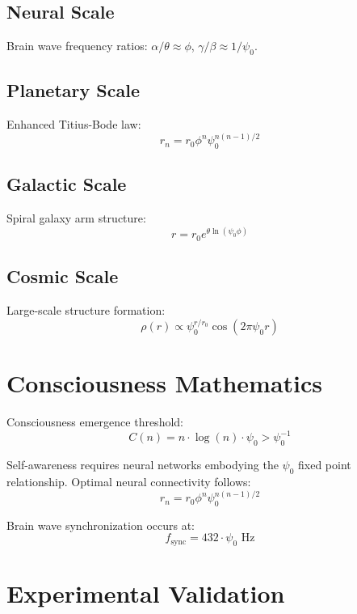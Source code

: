 \documentclass[12pt]{article}
\begin{document}
\subsection{Neural Scale}
Brain wave frequency ratios: $\alpha/\theta \approx \phi$, $\gamma/\beta \approx 1/\psi_0$.

\subsection{Planetary Scale}
Enhanced Titius-Bode law:
\begin{equation}
r_n = r_0 \phi^n \psi_0^{n(n-1)/2}
\end{equation}

\subsection{Galactic Scale}
Spiral galaxy arm structure:
\begin{equation}
r = r_0 e^{\theta \ln(\psi_0 \phi)}
\end{equation}

\subsection{Cosmic Scale}
Large-scale structure formation:
\begin{equation}
\rho(r) \propto \psi_0^{r/r_0} \cos(2\pi\psi_0 r)
\end{equation}

\section{Consciousness Mathematics}

Consciousness emergence threshold:
\begin{equation}
C(n) = n \cdot \log(n) \cdot \psi_0 > \psi_0^{-1}
\end{equation}

Self-awareness requires neural networks embodying the $\psi_0$ fixed point relationship. Optimal neural connectivity follows:
\begin{equation}
r_n = r_0 \phi^n \psi_0^{n(n-1)/2}
\end{equation}

Brain wave synchronization occurs at:
\begin{equation}
f_{\text{sync}} = 432 \cdot \psi_0 \text{ Hz}
\end{equation}

\section{Experimental Validation}
\end{document}
